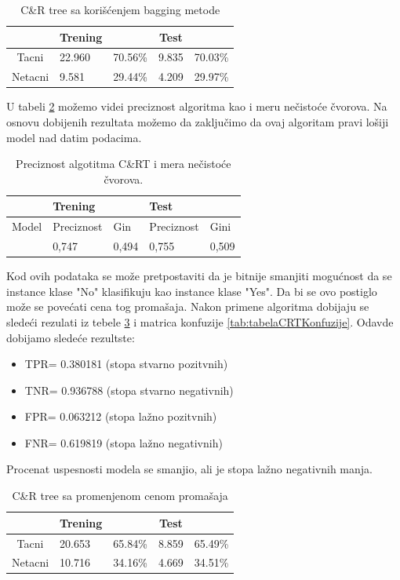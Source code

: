\documentclass[a4paper]{article}
\begin{document}
\begin{table}[h!]
\begin{center}
\caption{C\&R tree sa korišćenjem bagging metode}
\begin{tabular}{|c|l|r|c|c|} \hline
& Trening& & Test & \\ \hline
Tacni &22.960 &70.56\% &9.835 &70.03\%\\ \hline
Netacni &9.581 &29.44\% &4.209 &29.97\%\\ \hline
\end{tabular}
\label{tab:tabelaCrtBagging}
\end{center}
\end{table}

U tabeli \ref{tab:tabela C&RT Preciznost} možemo videi preciznost algoritma kao i meru nečistoće čvorova. Na osnovu dobijenih rezultata možemo da zaključimo da ovaj algoritam pravi lošiji model nad datim podacima.

\begin{table}[h!]
\begin{center}
\caption{Preciznost algotitma C\&RT i mera nečistoće čvorova.}
\begin{tabular}{|l|l|l|l|l|} \hline
& Trening& & Test & \\ \hline
Model &Preciznost&Gin&Preciznost&Gini\\ \hline
&0,747 &0,494 &0,755 &0,509\\ \hline
\end{tabular}
\label{tab:tabela C&RT Preciznost}
\end{center}
\end{table}
Kod ovih podataka se može pretpostaviti da je bitnije smanjiti mogućnost da se instance klase "No" klasifikuju kao instance klase "Yes". Da bi se ovo postiglo može se povećati cena tog promašaja. Nakon primene algoritma dobijaju se sledeći rezulati iz tebele \ref{tab:tabelaCrtCena} i matrica konfuzije \ref{tab:tabelaCRTKonfuzije}. Odavde dobijamo sledeće rezultste:
\begin{itemize}
    \item TPR= 0.380181 (stopa stvarno pozitvnih)
    \item TNR= 0.936788 (stopa stvarno negativnih)
    \item FPR= 0.063212 (stopa lažno pozitvnih)
    \item FNR= 0.619819 (stopa lažno negativnih)
\end{itemize}

Procenat uspesnosti modela se smanjio, ali je stopa lažno negativnih manja.
\begin{table}[h!]
\begin{center}
\caption{C\&R tree sa promenjenom cenom promašaja}
\begin{tabular}{|c|l|r|c|c|} \hline
& Trening& & Test & \\ \hline
Tacni &20.653 &65.84\% &8.859 &65.49\%\\ \hline
Netacni &10.716 &34.16\% &4.669 &34.51\%\\ \hline
\end{tabular}
\label{tab:tabelaCrtCena}
\end{center}
\end{table}
\end{document}
